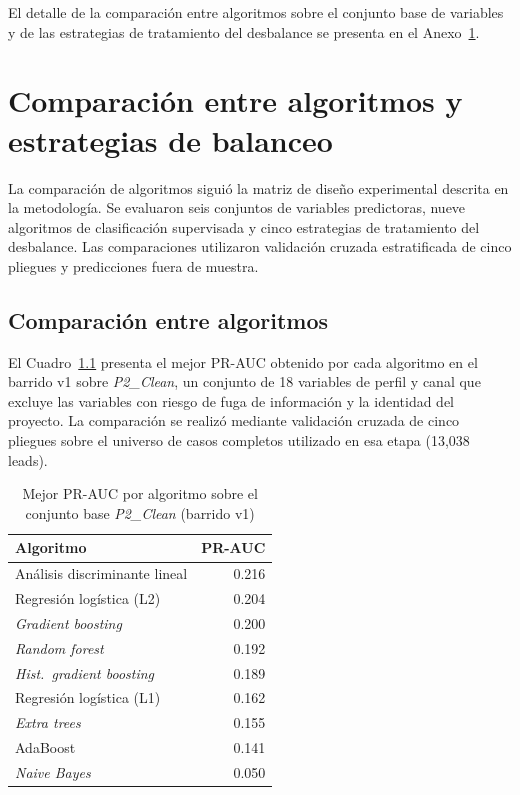 El detalle de la comparación entre algoritmos sobre el conjunto base de variables
y de las estrategias de tratamiento del desbalance se presenta en el
Anexo~\ref{anx:seleccion-algoritmos}.

\chapter{Comparación entre algoritmos y estrategias de balanceo}
\label{anx:seleccion-algoritmos}

La comparación de algoritmos siguió la matriz de diseño experimental descrita en la
metodología. Se evaluaron seis conjuntos de variables predictoras, nueve algoritmos
de clasificación supervisada y cinco estrategias de tratamiento del desbalance. Las
comparaciones utilizaron validación cruzada estratificada de cinco pliegues y
predicciones fuera de muestra.

\section{Comparación entre algoritmos}

El Cuadro~\ref{anx:cuad-algoritmos} presenta el mejor PR-AUC obtenido por cada
algoritmo en el barrido v1 sobre \emph{P2\_Clean}, un conjunto de 18 variables de
perfil y canal que excluye las variables con riesgo de fuga de información y la
identidad del proyecto. La comparación se realizó mediante validación cruzada de
cinco pliegues sobre el universo de casos completos utilizado en esa etapa
(13{,}038 leads).

\begin{table}[H]
\centering
\caption{Mejor PR-AUC por algoritmo sobre el conjunto base \emph{P2\_Clean} (barrido v1)}
\label{anx:cuad-algoritmos}
\begin{tabular}{lr}
\hline
\textbf{Algoritmo} & \textbf{PR-AUC} \\
\hline
Análisis discriminante lineal        & 0.216 \\
Regresión logística (L2)             & 0.204 \\
\emph{Gradient boosting}             & 0.200 \\
\emph{Random forest}                 & 0.192 \\
\emph{Hist.\ gradient boosting}      & 0.189 \\
Regresión logística (L1)             & 0.162 \\
\emph{Extra trees}                   & 0.155 \\
AdaBoost                             & 0.141 \\
\emph{Naive Bayes}                   & 0.050 \\
\hline
\end{tabular}
\fuentepropia
\end{table}

